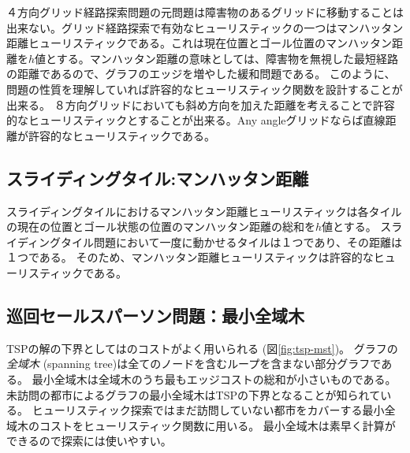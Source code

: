 ４方向グリッド経路探索問題の元問題は障害物のあるグリッドに移動することは出来ない。グリッド経路探索で有効なヒューリスティックの一つはマンハッタン距離ヒューリスティックである。これは現在位置とゴール位置のマンハッタン距離を$h$値とする。マンハッタン距離の意味としては、障害物を無視した最短経路の距離であるので、グラフのエッジを増やした緩和問題である。
このように、問題の性質を理解していれば許容的なヒューリスティック関数を設計することが出来る。
８方向グリッドにおいても斜め方向を加えた距離を考えることで許容的なヒューリスティックとすることが出来る。Any angleグリッドならば直線距離が許容的なヒューリスティックである。


\subsection{スライディングタイル:マンハッタン距離}
スライディングタイルにおけるマンハッタン距離ヒューリスティックは各タイルの現在の位置とゴール状態の位置のマンハッタン距離の総和を$h$値とする。
スライディングタイル問題において一度に動かせるタイルは１つであり、その距離は１つである。
そのため、マンハッタン距離ヒューリスティックは許容的なヒューリスティックである。



\subsection{巡回セールスパーソン問題：最小全域木}
TSPの解の下界としてはのコストがよく用いられる (図\ref{fig:tsp-mst})。
グラフの{\it 全域木} (spanning tree)は全てのノードを含むループを含まない部分グラフである。
最小全域木は全域木のうち最もエッジコストの総和が小さいものである。
未訪問の都市によるグラフの最小全域木はTSPの下界となることが知られている。
ヒューリスティック探索ではまだ訪問していない都市をカバーする最小全域木のコストをヒューリスティック関数に用いる。
最小全域木は素早く計算ができるので探索には使いやすい。

